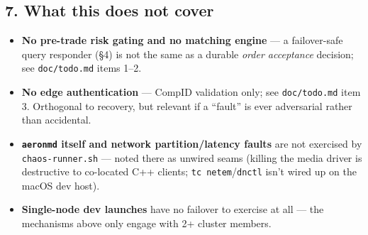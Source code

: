 \documentclass[
  10pt,
]{article}
\providecommand{\tightlist}{%
  \setlength{\itemsep}{0pt}\setlength{\parskip}{0pt}}
\begin{document}
\subsection{7. What this does not cover}\label{what-this-does-not-cover}

\begin{itemize}
\tightlist
\item
  \textbf{No pre-trade risk gating and no matching engine} --- a
  failover-safe query responder (§4) is not the same as a durable
  \emph{order acceptance} decision; see \texttt{doc/todo.md} items 1--2.
\item
  \textbf{No edge authentication} --- CompID validation only; see
  \texttt{doc/todo.md} item 3. Orthogonal to recovery, but relevant if a
  ``fault'' is ever adversarial rather than accidental.
\item
  \textbf{\texttt{aeronmd} itself and network partition/latency faults}
  are not exercised by \texttt{chaos-runner.sh} --- noted there as
  unwired seams (killing the media driver is destructive to co-located
  C++ clients; \texttt{tc\ netem}/\texttt{dnctl} isn't wired up on the
  macOS dev host).
\item
  \textbf{Single-node dev launches} have no failover to exercise at all
  --- the mechanisms above only engage with 2+ cluster members.
\end{itemize}
\end{document}

